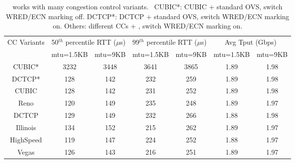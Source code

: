 \begin{table}[!t]
\tiny
\begin{center}
\begin{tabular}{ |c|c|c|c|c|c|c| }
 \hline
 \multirow{2}{*}{CC Variants} & \multicolumn{2}{|c|}{50$^{th}$ percentile RTT ($\mu$s)} & \multicolumn{2}{|c|}{99$^{th}$ percentile RTT ($\mu$s)} & \multicolumn{2}{|c|}{Avg Tput (Gbps)}\\
 \cline{2-7}
       &  mtu=1.5KB & mtu=9KB & mtu=1.5KB & mtu=9KB & mtu=1.5KB & mtu=9KB \\
 \hline
 \hline
 CUBIC* &  3232     &   3448    &   3641     &  3865     &   1.89    & 1.98   \\
 DCTCP* &  128      &   142    &   232    &   259    &   1.89    &   1.98  \\
 \hline
 \hline
 CUBIC &   128     &   142    &    231    &   252    &   1.89    &  1.98   \\
 Reno  &   120     &   149    &    235    &   248    &   1.89    &  1.97   \\
DCTCP  &   129     &   149    &    232    &   266    &   1.88    &  1.98    \\
Illinois  &   134     &   152    &    215    &  262     &   1.89    &  1.97    \\
HighSpeed  &   119     &  147     &    224    &  252     &   1.88    & 1.97     \\
 Vegas  &   126     &   143    &    216    &    251   &   1.89    &  1.97   \\

 \hline

\end{tabular}
\caption{\acdc{} works with many congestion control variants.~
        CUBIC*: CUBIC + standard OVS, switch WRED/ECN marking off.
        DCTCP*: DCTCP + standard OVS, switch WRED/ECN marking on.
        Others: different CCs + \acdc{}, switch WRED/ECN marking on.}
\label{other_cc_variants}
\end{center}
\end{table}

